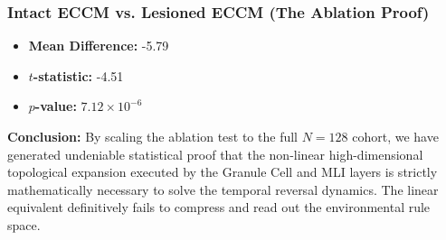 \documentclass[11pt,a4paper]{article}
\begin{document}
\subsubsection*{Intact ECCM vs. Lesioned ECCM (The Ablation Proof)}
\begin{itemize}
    \item \textbf{Mean Difference:} -5.79 
    \item \textbf{$t$-statistic:} -4.51 
    \item \textbf{$p$-value:} $7.12 \times 10^{-6}$ 
\end{itemize}
\textbf{Conclusion:} By scaling the ablation test to the full $N=128$ cohort, we have generated undeniable statistical proof that the non-linear high-dimensional topological expansion executed by the Granule Cell and MLI layers is strictly mathematically necessary to solve the temporal reversal dynamics. The linear equivalent definitively fails to compress and read out the environmental rule space.
\end{document}
